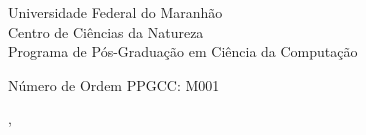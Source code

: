   \begin{capa}%
    \center
	\ABNTEXchapterfont\large{Universidade Federal do Maranh\~ao \\ Centro de Ci\^encias da Natureza \\ Programa de P\'os-Gradua\c{c}\~ao em Ci\^encia da Computa\c{c}\~ao}

    \vfill
    \ABNTEXchapterfont\bfseries\LARGE\imprimirtitulo
    \vfill

	\ABNTEXchapterfont\large\imprimirautor
	\vfill
%
	Número de Ordem PPGCC: M001
	
    \large\imprimirlocal, \large\imprimirdata

    \vspace*{1cm}
  \end{capa}
